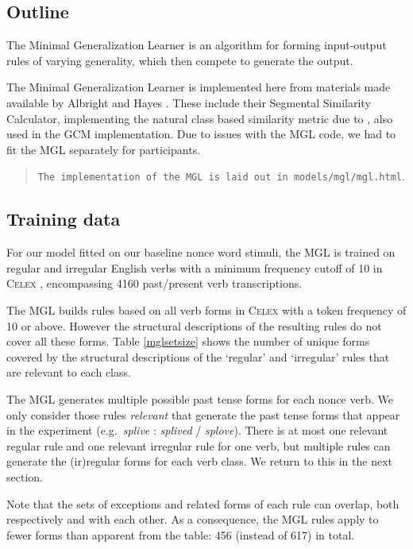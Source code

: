 \documentclass[12pt]{article}
\begin{document}
\subsection{Outline}

The Minimal Generalization Learner is an algorithm for forming input-output rules of varying generality, which then compete to generate the output. 

The Minimal Generalization Learner is implemented here from materials made available by Albright and Hayes \citep{albright2003rules}. These include their Segmental Similarity Calculator, implementing the natural class based similarity metric due to \cite{frisch1997similarity}, also used in the GCM implementation. Due to issues with the MGL code, we had to fit the MGL separately for participants.

\begin{quote}
 \texttt{The implementation of the MGL is laid out in models/mgl/mgl.html}.
\end{quote}

\subsection{Training data}

For our model fitted on our baseline nonce word stimuli, the MGL is trained on regular and irregular English verbs with a minimum frequency cutoff of 10 in \textsc{Celex} \citep{baayen1993celex}, encompassing 4160 past/present verb transcriptions. 

The MGL builds rules based on all verb forms in \textsc{Celex} with a token frequency of 10 or above. However the structural descriptions of the resulting rules do not cover all these forms. Table \ref{mglsetsize} shows the number of unique forms covered by the structural descriptions of the `regular' and `irregular' rules that are relevant to each class. 

The MGL generates multiple possible past tense forms for each nonce verb. We only consider those rules {\em relevant} that generate the past tense forms that appear in the experiment (e.g.\ {\em splive} : {\em splived} / {\em splove}). There is at most one relevant regular rule and one relevant irregular rule for one verb, but multiple rules can generate the (ir)regular forms for each verb class. We return to this in the next section.

Note that the sets of exceptions and related forms of each rule can overlap, both respectively and with each other. As a consequence, the MGL rules apply to fewer forms than apparent from the table: 456 (instead of 617) in total.
\end{document}

